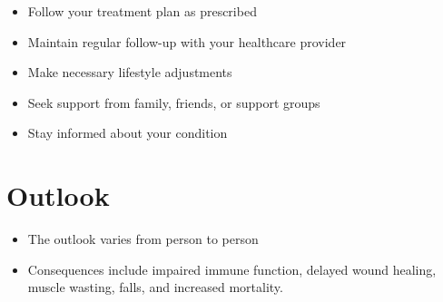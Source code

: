 \begin{itemize}[noitemsep]
  \item Follow your treatment plan as prescribed
  \item Maintain regular follow-up with your healthcare provider
  \item Make necessary lifestyle adjustments
  \item Seek support from family, friends, or support groups
  \item Stay informed about your condition
\end{itemize}
\section{Outlook}
\begin{itemize}[noitemsep]
  \item The outlook varies from person to person
  \item Consequences include impaired immune function, delayed wound healing, muscle wasting, falls, and increased mortality.
\end{itemize}
